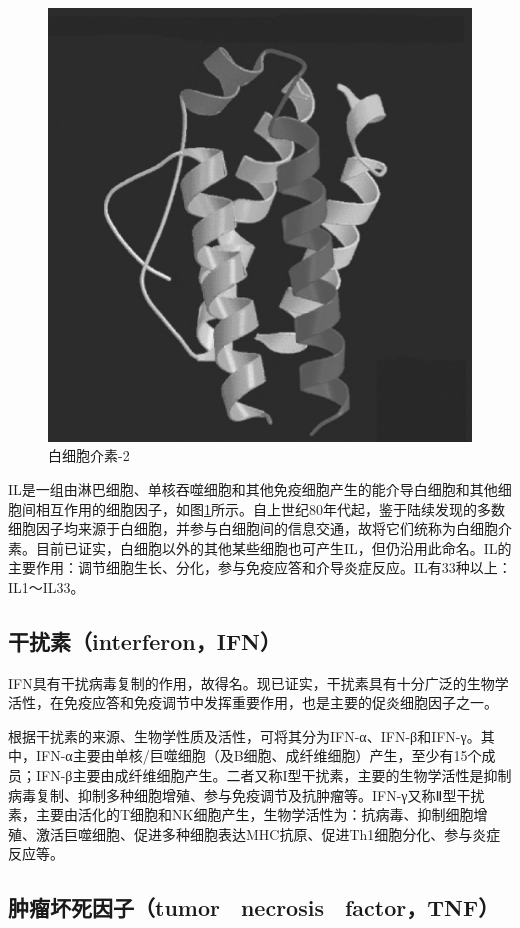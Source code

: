 \begin{figure}[!htbp]
 \centering
 \includegraphics[width=.6\textwidth]{./images/Image00094.jpg}
 \captionsetup{justification=centering}
 \caption{白细胞介素-2}
 \label{fig6-4}
  \end{figure} 

IL是一组由淋巴细胞、单核吞噬细胞和其他免疫细胞产生的能介导白细胞和其他细胞间相互作用的细胞因子，如图\ref{fig6-4}所示。自上世纪80年代起，鉴于陆续发现的多数细胞因子均来源于白细胞，并参与白细胞间的信息交通，故将它们统称为白细胞介素。目前已证实，白细胞以外的其他某些细胞也可产生IL，但仍沿用此命名。IL的主要作用：调节细胞生长、分化，参与免疫应答和介导炎症反应。IL有33种以上：IL1～IL33。


\subsection{干扰素（interferon，IFN）}

IFN具有干扰病毒复制的作用，故得名。现已证实，干扰素具有十分广泛的生物学活性，在免疫应答和免疫调节中发挥重要作用，也是主要的促炎细胞因子之一。

根据干扰素的来源、生物学性质及活性，可将其分为IFN-α、IFN-β和IFN-γ。其中，IFN-α主要由单核/巨噬细胞（及B细胞、成纤维细胞）产生，至少有15个成员；IFN-β主要由成纤维细胞产生。二者又称I型干扰素，主要的生物学活性是抑制病毒复制、抑制多种细胞增殖、参与免疫调节及抗肿瘤等。IFN-γ又称Ⅱ型干扰素，主要由活化的T细胞和NK细胞产生，生物学活性为：抗病毒、抑制细胞增殖、激活巨噬细胞、促进多种细胞表达MHC抗原、促进Th1细胞分化、参与炎症反应等。


\subsection{肿瘤坏死因子（tumor　necrosis　factor，TNF）}

